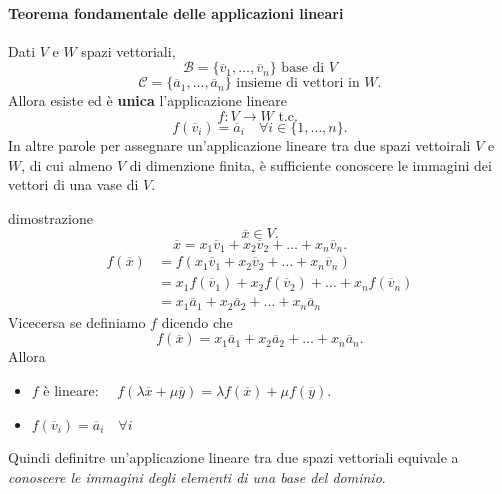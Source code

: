 \documentclass[x11names]{article}
\begin{document}
\begin{center}
\colorbox{Bisque1}{\begin{minipage}{5.75in}
\begin{yes}{}
\paragraph{Teorema fondamentale delle applicazioni lineari }
Dati $V$ e  $W$ spazi vettoriali,
\[
\mathscr{B} = \{\overline{v}_{1},\dots,\overline{v}_{n}\} \text{ base di }V
\] 
\[
\mathscr{C} = \{\overline{a}_{1},\dots,\overline{a}_{n}\} \text{ insieme di vettori in }W
.\] 
Allora esiste ed è \textbf{unica} l'applicazione lineare
\[
f: V \longrightarrow W \text{ t.c. }
\] 
\[
f\left(\overline{v}_{i}\right) = \overline{a}_{i} \quad \forall i \in \{1,\dots,n\}
.\] 
In altre parole per assegnare un'applicazione lineare tra due spazi vettoirali $V$ e $W$, di cui almeno $V$ di dimenzione finita, è sufficiente conoscere le immagini dei vettori di una vase di $V$.
\end{yes}
\end{minipage}}        
\end{center}

\begin{es}{dimostrazione}
\[
\overline{x} \in V
.\] 
\[
\overline{x} = x_1 \overline{v}_{1} + x_2\overline{v}_{2} + \dots + x_{n}\overline{v}_{n}
.\] 
\begin{align*}
	f\left(\overline{x}\right) &= f\left(x_1 \overline{v}_{1} + x_2\overline{v}_{2} + \dots + x_{n}\overline{v}_{n}\right) \\
				   &= x_1 f\left(\overline{v}_{1}\right) + x_2 f\left(\overline{v}_{2}\right) + \dots + x_{n}f\left(\overline{v}_{n}\right) \\
				   &= x_1 \overline{a}_{1} + x_2 \overline{a}_{2} + \dots + x_{n} \overline{a}_{n}
\end{align*}
Vicecersa se definiamo $f$ dicendo che 
\[
f\left(\overline{x}\right) = x_1 \overline{a}_{1} + x_2 \overline{a}_{2} + \dots + x_{n} \overline{a}_{n}
.\] 
Allora
\begin{itemize}
	\item $f$ è lineare: $\quad f\left(\lambda \overline{x} + \mu \overline{y}\right) = \lambda f\left(\overline{x}\right) + \mu f\left(\overline{y}\right)$.
	\item $f\left(\overline{v}_{i}\right) = \overline{a}_{i} \quad \forall i$
\end{itemize}
\end{es}


Quindi definitre un'applicazione lineare tra due spazi vettoriali equivale a \textit{conoscere le immagini degli elementi di una base del dominio}.
\end{document}
